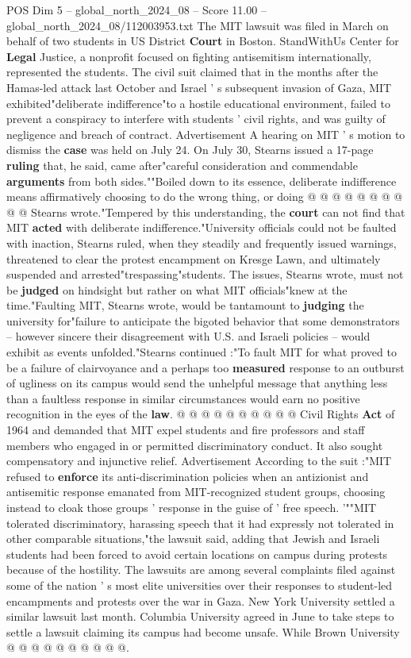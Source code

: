 \begin{textsample}{POS Dim 5 – global\_north\_2024\_08 – Score 11.00 – global\_north\_2024\_08/112003953.txt}
The MIT lawsuit was filed in March on behalf of two students in US District \textbf{Court} in Boston.
StandWithUs Center for \textbf{Legal} Justice, a nonprofit focused on fighting antisemitism internationally, represented the students.
The civil suit claimed that in the months after the Hamas-led attack last October and Israel ' s subsequent invasion of Gaza, MIT exhibited"deliberate indifference"to a hostile educational environment, failed to prevent a conspiracy to interfere with students ' civil rights, and was guilty of negligence and breach of contract.
Advertisement A hearing on MIT ' s motion to dismiss the \textbf{case} was held on July 24.
On July 30, Stearns issued a 17-page \textbf{ruling} that, he said, came after"careful consideration and commendable \textbf{arguments} from both sides.""Boiled down to its essence, deliberate indifference means affirmatively choosing to do the wrong thing, or doing @ @ @ @ @ @ @ @ @ @ Stearns wrote."Tempered by this understanding, the \textbf{court} can not find that MIT \textbf{acted} with deliberate indifference."University officials could not be faulted with inaction, Stearns ruled, when they steadily and frequently issued warnings, threatened to clear the protest encampment on Kresge Lawn, and ultimately suspended and arrested"trespassing"students.
The issues, Stearns wrote, must not be \textbf{judged} on hindsight but rather on what MIT officials"knew at the time."Faulting MIT, Stearns wrote, would be tantamount to \textbf{judging} the university for"failure to anticipate the bigoted behavior that some demonstrators -- however sincere their disagreement with U.S. and Israeli policies -- would exhibit as events unfolded."Stearns continued :"To fault MIT for what proved to be a failure of clairvoyance and a perhaps too \textbf{measured} response to an outburst of ugliness on its campus would send the unhelpful message that anything less than a faultless response in similar circumstances would earn no positive recognition in the eyes of the \textbf{law}. @ @ @ @ @ @ @ @ @ @ Civil Rights \textbf{Act} of 1964 and demanded that MIT expel students and fire professors and staff members who engaged in or permitted discriminatory conduct.
It also sought compensatory and injunctive relief.
Advertisement According to the suit :"MIT refused to \textbf{enforce} its anti-discrimination policies when an antizionist and antisemitic response emanated from MIT-recognized student groups, choosing instead to cloak those groups ' response in the guise of ' free speech. '""MIT tolerated discriminatory, harassing speech that it had expressly not tolerated in other comparable situations,"the lawsuit said, adding that Jewish and Israeli students had been forced to avoid certain locations on campus during protests because of the hostility.
The lawsuits are among several complaints filed against some of the nation ' s most elite universities over their responses to student-led encampments and protests over the war in Gaza.
New York University settled a similar lawsuit last month.
Columbia University agreed in June to take steps to settle a lawsuit claiming its campus had become unsafe.
While Brown University @ @ @ @ @ @ @ @ @ @.


\end{textsample}
